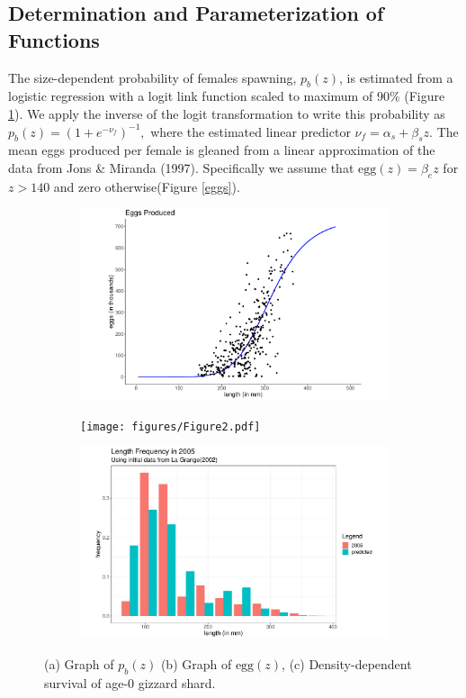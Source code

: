 \documentclass[11pt,oneside]{amsart}
\theoremstyle{definition}
\begin{document}
\subsection{Determination and Parameterization of Functions}
The size-dependent probability of females spawning, $p_b(z)$, is estimated from a logistic regression with a logit link function scaled to maximum of 90\% (Figure \ref{fig:repro_prob}). We apply the inverse of the logit transformation to write this probability as $p_b(z) = (1+e^{-\nu_f})^{-1},$ where the estimated linear predictor $\nu_f = \alpha_s + \beta_s z$.  The mean eggs produced per female is gleaned from a linear approximation of the data from Jons \& Miranda (1997).  Specifically we assume that $\mbox{egg}(z) = \beta_e z$ for $z>140$ and zero otherwise(Figure \ref{eggs}). 

\begin{figure}
\centering
\begin{subfigure}[b]{.32\textwidth}
  \includegraphics[width=\textwidth]{figures/Figure1.pdf}
  \caption{}
  \label{fig:repro_prob}
\end{subfigure}
\begin{subfigure}[b]{.32\textwidth}
  \texttt{[image: figures/Figure2.pdf]}
  \caption{}
  \label{fig:eggs}
\end{subfigure}
\begin{subfigure}[b]{.32\textwidth}
  \includegraphics[width=\textwidth]{figures/Figure3.pdf}
  \caption{}
  \label{fig:surv_age0}
\end{subfigure}
\caption{(a) Graph of $p_b(z)$ (b) Graph of $\mbox{egg}(z)$, (c) Density-dependent survival of age-0 gizzard shard.}
\label{fig:fecundity}
\end{figure}    
\end{document}

